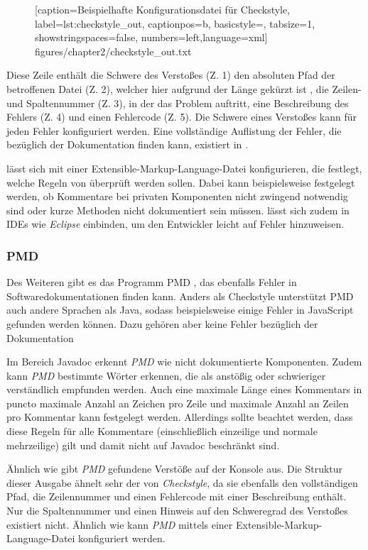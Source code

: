 	\begin{figure}[h!]
			
			[caption={Beispielhafte Konfigurationsdatei für Checkstyle},
			label={lst:checkstyle_out},
			captionpos=b, basicstyle=\footnotesize, tabsize=1, showstringspaces=false,  numbers=left,language=xml]
			{figures/chapter2/checkstyle_out.txt}
		\end{figure}
		
Diese Zeile enthält die Schwere des Verstoßes (Z. 1) den absoluten Pfad der betroffenen Datei (Z. 2), welcher hier aufgrund der Länge gekürzt ist , die Zeilen- und Spaltennummer (Z. 3), in der das Problem auftritt, eine Beschreibung des Fehlers (Z. 4) und einen Fehlercode (Z. 5). Die Schwere eines Verstoßes kann für jeden Fehler konfiguriert werden. Eine vollständige Auflistung der Fehler, die \cs bezüglich der Dokumentation finden kann,  existiert in \cite{checkstyle_doc_metrics}.

			
\cs lässt sich mit einer Extensible-Markup-Language-Datei konfigurieren, die festlegt, welche Regeln von \cs überprüft werden sollen. Dabei kann beispielsweise festgelegt werden, ob Kommentare bei privaten Komponenten nicht zwingend notwendig sind oder kurze Methoden nicht dokumentiert sein müssen.
\cs lässt sich zudem in \ac{IDE}s wie \textit{Eclipse} einbinden, um den Entwickler leicht auf Fehler hinzuweisen. 
\subsubsection{PMD}
Des Weiteren gibt es das Programm PMD \cite{PMD}, das ebenfalls Fehler in Softwaredokumentationen finden kann.  Anders als Checkstyle unterstützt PMD auch andere Sprachen als Java, sodass beispielsweise einige Fehler in JavaScript gefunden werden können. Dazu gehören aber keine Fehler bezüglich der Dokumentation

Im Bereich  Javadoc erkennt \textit{PMD} wie \cs nicht dokumentierte Komponenten. Zudem kann \textit{PMD} bestimmte Wörter erkennen, die als anstößig oder schwieriger verständlich empfunden werden. Auch eine maximale Länge eines Kommentars in puncto maximale Anzahl an Zeichen pro Zeile und maximale Anzahl an Zeilen pro Kommentar kann festgelegt werden. Allerdings sollte beachtet werden, dass diese Regeln für alle Kommentare (einschließlich einzeilige und normale mehrzeilige) gilt und damit nicht auf Javadoc beschränkt sind. 

Ähnlich wie \cs gibt \textit{PMD} gefundene Verstöße auf der Konsole aus. Die Struktur dieser Ausgabe ähnelt sehr der von \textit{Checkstyle}, da sie ebenfalls den vollständigen Pfad, die Zeilennummer und einen Fehlercode mit einer Beschreibung enthält. Nur die Spaltennummer  und einen Hinweis auf den Schweregrad des Verstoßes existiert nicht. Ähnlich wie \cs kann \textit{PMD} mittels einer Extensible-Markup-Language-Datei konfiguriert werden.

